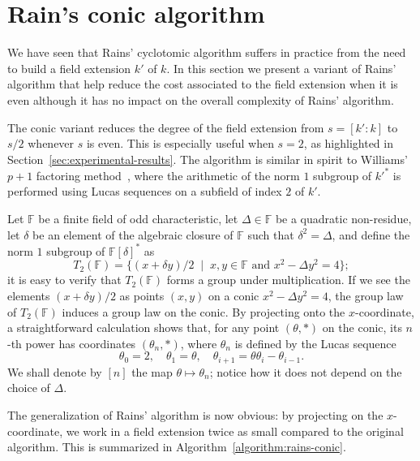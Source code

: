 \documentclass[12pt]{article}
\theoremstyle{plain}
\theoremstyle{definition}
\def\F{\ensuremath{\mathbb{F}}}
\newcounter{algorithm}
\begin{document}

\section{Rain's conic algorithm}
\label{app:rains-vars}

We have seen that Rains' cyclotomic algorithm suffers in practice from
the need to build a field extension $k'$ of $k$. %
In this section we present a variant of Rains' algorithm that help
reduce the cost associated to the field extension when it is even %
although it has no impact on the overall complexity of
Rains' algorithm.

The conic variant reduces the degree of the field extension from
$s=[k':k]$ to $s/2$ whenever $s$ is even. %
This is especially useful when $s=2$, as highlighted in
Section~\ref{sec:experimental-results}. %
The algorithm is similar in spirit to Williams' $p+1$ factoring
method~\cite{williams1982}, where the arithmetic of the norm $1$
subgroup of ${k'}^*$ is performed using Lucas sequences on a subfield
of index $2$ of $k'$.

Let $\F$ be a finite field of odd characteristic, let $\Delta\in\F$ be
a quadratic non-residue, let $\delta$ be an element of the algebraic
closure of $\F$ such that $\delta^2=\Delta$, and define the norm $1$
subgroup of $\F[\delta]^*$ as
\[T_2(\F) = \{(x+\delta y)/2 \;\mid\; x,y\in\F \text{ and } x^2-\Delta
  y^2 = 4\};\] %
it is easy to verify that $T_2(\F)$ forms a group under
multiplication. %
If we see the elements $(x+\delta y)/2$ as points $(x,y)$ on a conic
$x^2-\Delta y^2=4$, the group law of $T_2(\F)$ induces a group law on
the conic. %
By projecting onto the $x$-coordinate, a straightforward calculation
shows that, for any point $(\theta,*)$ on the conic, its $n$-th power
has coordinates $(\theta_n,*)$, where $\theta_n$ is defined by the
Lucas sequence
\[\theta_0 = 2, \quad \theta_1 = \theta, \quad \theta_{i+1}=\theta\theta_i-\theta_{i-1}.\] %
We shall denote by $[n]$ the map $\theta\mapsto\theta_n$; notice how
it does not depend on the choice of $\Delta$.

The generalization of Rains' algorithm is now obvious: by projecting
on the $x$-coordinate, we work in a field extension twice as small
compared to the original algorithm. %
This is summarized in Algorithm~\ref{algorithm:rains-conic}.
\end{document}
